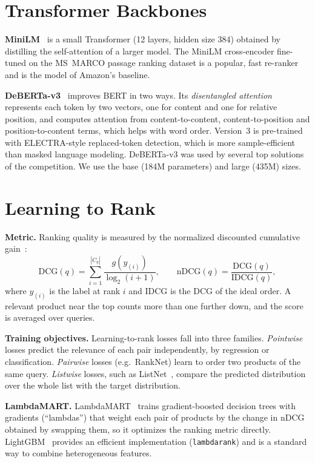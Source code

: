 \documentclass[12pt,a4paper]{report}
\begin{document}
\section{Transformer Backbones}
\textbf{MiniLM}~\cite{minilm} is a small Transformer (12 layers, hidden size 384) obtained by distilling the self-attention of a larger model. The MiniLM cross-encoder fine-tuned on the MS~MARCO passage ranking dataset is a popular, fast re-ranker and is the model of Amazon's baseline.

\textbf{DeBERTa-v3}~\cite{deberta} improves BERT in two ways. Its \emph{disentangled attention} represents each token by two vectors, one for content and one for relative position, and computes attention from content-to-content, content-to-position and position-to-content terms, which helps with word order. Version~3 is pre-trained with ELECTRA-style replaced-token detection, which is more sample-efficient than masked language modeling. DeBERTa-v3 was used by several top solutions of the competition. We use the base (184M parameters) and large (435M) sizes.

\section{Learning to Rank}
\label{sec:ndcg}
\textbf{Metric.} Ranking quality is measured by the normalized discounted cumulative gain~\cite{ndcg}:
\[
\mathrm{DCG}(q) = \sum_{i=1}^{|C_q|} \frac{g(y_{(i)})}{\log_2(i+1)},\qquad
\mathrm{nDCG}(q) = \frac{\mathrm{DCG}(q)}{\mathrm{IDCG}(q)},
\]
where $y_{(i)}$ is the label at rank $i$ and IDCG is the DCG of the ideal order. A relevant product near the top counts more than one further down, and the score is averaged over queries.

\textbf{Training objectives.} Learning-to-rank losses fall into three families. \emph{Pointwise} losses predict the relevance of each pair independently, by regression or classification. \emph{Pairwise} losses (e.g.\ RankNet) learn to order two products of the same query. \emph{Listwise} losses, such as ListNet~\cite{listnet}, compare the predicted distribution over the whole list with the target distribution.

\textbf{LambdaMART.} LambdaMART~\cite{lambdamart} trains gradient-boosted decision trees with gradients (``lambdas'') that weight each pair of products by the change in nDCG obtained by swapping them, so it optimizes the ranking metric directly. LightGBM~\cite{lightgbm} provides an efficient implementation (\texttt{lambdarank}) and is a standard way to combine heterogeneous features.
\end{document}
